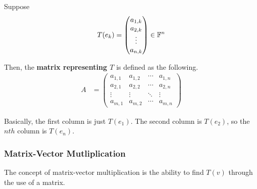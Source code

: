 \begin{definition}
    Suppose
    \begin{align*}
        T (e_k) = \begin{pmatrix} a_{1, k} \\ a_{2, k} \\ \vdots \\ a_{n, k} \end{pmatrix} \in \mathbb{F}^n
    \end{align*}
    
    Then, the \textbf{matrix representing $T$} is defined as the following.
    \begin{align*}
        A &= 
        \begin{pmatrix}
            a_{1, 1} & a_{1, 2} & \cdots & a_{1, n} \\
            a_{2, 1} & a_{2, 2} & \cdots & a_{2, n} \\
            \vdots & \vdots & \ddots & \vdots \\
            a_{m, 1} & a_{m, 2} & \cdots & a_{m, n}
        \end{pmatrix}
    \end{align*}

    Basically, the first column is just $T(e_1)$. The second column is $T(e_2)$, so the $nth$ column is $T(e_n)$.
\end{definition}

\subsubsection{Matrix-Vector Mutliplication}
The concept of matrix-vector multiplication is the ability to find $T(v)$ through the use of a matrix.

